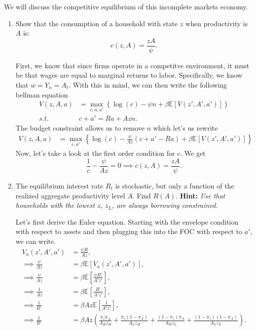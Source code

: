 \documentclass[11pt,english]{article}
\begin{document}
We will discuss the competitive equilibrium of this incomplete markets economy.
 
\begin{enumerate}[label = (\alph*)]
  \item Show that the consumption of a household with state $z$ when
    productivity is $A$ is:
    \[
      c(z, A) = \frac{zA}{\psi}.
    \]
 \begin{solution}
First, we know that since firms operate in a competitve environment, it must be that wages are equal to marginal returns to labor. Specifically, we know that $w = Y_n = A_t$. With this in mind, we can then write the following bellman equation 
\begin{align*}
V(z, A, a) &= \max_{c, n, a'}\left\{\log(c) - \psi n + \beta \mathbb{E}[V(z',A', a')]\right\}\\
s.t. \quad & c + a' = Ra + Azn.
\end{align*}
The budget constraint allows us to remove $n$ which let's us rewrite
\begin{align*}
V(z, A, a) &= \max_{c, a'}\left\{\log(c) - \frac{\psi}{Az} \left(c + a' - Ra\right) + \beta \mathbb{E}[V(z',A', a')]\right\}
\end{align*} Now, let's take a look at the first order condition for $c$. We get
$$\frac{1}{c} - \frac{\psi}{Az} = 0 \implies c(z,A) = \frac{zA}{\psi}.$$
\end{solution}
  \item The equilibrium interest rate $R_t$ is stochastic, but only a
    function of the realized aggregate productivity level $A$. Find $R(A)$.
    \textbf{Hint:} \textit{Use that households with the lowest $z$, $z_L$, are
    always borrowing constrained.}
  \begin{solution}
Let's first derive the Euler equation. Starting with the envelope condition with respect to assets and then plugging this into the FOC with respect to $a'$, we can write.
\begin{align*}
V_a(z', A', a') &= \frac{\psi R}{Az},\\
\implies \frac{\psi}{Az}&= \beta \mathbb{E}[V_a(z', A', a')],\\
\implies \frac{\psi}{Az}&= \beta \mathbb{E}\left[\frac{\psi R'}{A'z'}\right],\\
\implies \frac{1}{Az}&= \beta \mathbb{E}\left[\frac{R'}{A'z'}\right],\\
\implies \frac{1}{R'} &= \beta Az\mathbb{E}\left[\frac{1}{A'z'}\right],\\
\implies \frac{1}{R'} &= \beta Az\left(\frac{\pi_z\pi_A}{A_Hz_H} + \frac{\pi_z(1-\pi_A)}{A_Lz_H} + \frac{(1-\pi_z)\pi_A}{A_Hz_L} + \frac{(1-\pi_z)(1-\pi_A)}{A_Lz_L}\right).

\end{align*}
\end{solution}
\end{enumerate}
\end{document}
